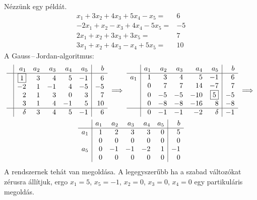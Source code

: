 \documentclass[a4paper, showtrims]{memoir}
\theoremstyle{plain}
\theoremstyle{remark}
\theoremstyle{definition}
\begin{document}
Nézzünk egy példát.
\[
	\begin{array}{rl}
		x_1+3x_2+4x_3+5x_4-x_5=  & 6  \\
		-2x_1+x_2-x_3+4x_4-5x_5= & -5 \\
		2x_1+x_2+3x_3+3x_5=      & 7  \\
		3x_1+x_2+4x_3-x_4+5x_5=  & 10
	\end{array}
\]
A Gauss\,--\,Jordan-algoritmus:
\begin{multline*}
	\begin{array}{c|rrrrr|r}
		 & a_1       & a_2 & a_3 & a_4 & a_5 & b  \\
		\hline
		 & \boxed{1} & 3   & 4   & 5   & -1  & 6  \\
		 & -2        & 1   & -1  & 4   & -5  & -5 \\
		 & 2         & 1   & 3   & 0   & 3   & 7  \\
		 & 3         & 1   & 4   & -1  & 5   & 10 \\
		\hline
		 & \delta    & 3   & 4   & 5   & -1  & 6
	\end{array}
	\implies
	\begin{array}{c|rrrrr|r}
		    & a_1 & a_2 & a_3 & a_4 & a_5       & b  \\
		\hline
		a_1 & 1   & 3   & 4   & 5   & -1        & 6  \\
		    & 0   & 7   & 7   & 14  & -7        & 7  \\
		    & 0   & -5  & -5  & -10 & \boxed{5} & -5 \\
		    & 0   & -8  & -8  & -16 & 8         & -8 \\
		\hline
		    & 0   & -1  & -1  & -2  & \delta    & -1
	\end{array}
	\implies
	\\
	\begin{array}{c|rrrrr|r}
		    & a_1 & a_2 & a_3 & a_4 & a_5 & b  \\
		\hline
		a_1 & 1   & 2   & 3   & 3   & 0   & 5  \\
		    & 0   & 0   & 0   & 0   & 0   & 0  \\
		a_5 & 0   & -1  & -1  & -2  & 1   & -1 \\
		    & 0   & 0   & 0   & 0   & 0   & 0  \\
	\end{array}
\end{multline*}
A rendszernek tehát van megoldása.
A legegyszerűbb ha a szabad változókat zérusra állítjuk,
ergo $x_1=5$, $x_5=-1$, $x_2=0$, $x_3=0$, $x_4=0$ egy partikuláris megoldás.
\end{document}
